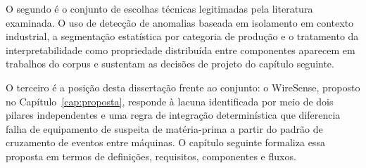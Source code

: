 O segundo é o conjunto de escolhas técnicas legitimadas pela literatura examinada. O uso de detecção de anomalias baseada em isolamento em contexto industrial, a segmentação estatística por categoria de produção e o tratamento da interpretabilidade como propriedade distribuída entre componentes aparecem em trabalhos do corpus e sustentam as decisões de projeto do capítulo seguinte.

O terceiro é a posição desta dissertação frente ao conjunto: o WireSense, proposto no Capítulo~\ref{cap:proposta}, responde à lacuna identificada por meio de dois pilares independentes e uma regra de integração determinística que diferencia falha de equipamento de suspeita de matéria-prima a partir do padrão de cruzamento de eventos entre máquinas. O capítulo seguinte formaliza essa proposta em termos de definições, requisitos, componentes e fluxos.
